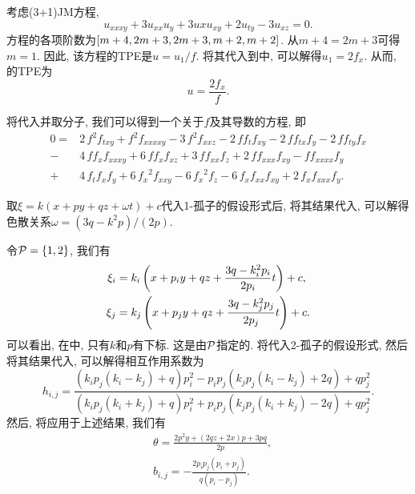 考虑(3+1)JM方程\CITEcaJM,
\begin{equation}
    u_{xxxy}+3u_{xx}u_y+3u{x}u_{xy}+2u_{ty}-3u_{xz}=0. \label{JMEQ3}
\end{equation}
方程的各项阶数为$\left[m+4,2m+3,2m+3,m+2,m+2\right]$. 从$m+4=2m+3$可得$m=1$. 因此, 该方程的TPE是$u=u_1/f$. 将其代入到中, 可以解得$u_1=2f_x$. 从而, 的TPE为 
\begin{equation}
u=\frac{2f_x}{f}. \label{JMEQ-tr}    
\end{equation}

将代入并取分子, 我们可以得到一个关于$f$及其导数的方程, 即 
\begin{equation}
\begin{split}
0=&2\,{f}^{2}f_{{{ txy}}}+{f}^{2}f_{{{ xxxxy}}}-3\,{f}^{2}f_{{{ xxz}}}-2\,ff_{{t}}f_{{{ xy}}}-2\,ff_{{{ tx}}}f_{{y}}-2\,ff_{{{ ty}}}f_{{x}}\\
-&4\,ff_{{x}}f_{{{ xxxy}}}+6\,ff_{{x}}f_{{{ xz}}}+3\,ff_{{{ xx}}}f_{{z}}+2\,ff_{{{ xxx}}}f_{{{xy}}}-ff_{{{ xxxx}}}f_{{y}}\\
+&4\,f_{{t}}f_{{x}}f_{{y}}+6\,{f_{{x}}}^{2}f_{{{ xxy}}}-6\,{f_{{x}}}^{2}f_{{z}}-6\,f_{{x}}f_{{{ xx}}}f_{{{ xy}}}+2\,f_{{x}}f_{{{ xxx}}}f_{{y}}. \label{JMEQ-feq}
\end{split}
\end{equation}

取$\xi=k(x+py+qz+\omega t)+c$代入1-孤子的假设形式后, 将其结果代入, 可以解得色散关系$\omega=(3q-k^2p)/(2p)$.

令$\mathcal{P}=\left\{1,2\right\}$, 我们有
\begin{equation}
\begin{split}
\xi_i&=k_i\left(x+p_iy+qz+\frac{3q-k_i^2p_i}{2p_i}t\right)+c, \\ 
\xi_j&=k_j\left(x+p_jy+qz+\frac{3q-k_j^2p_j}{2p_j}t\right)+c.
\end{split} \label{JMEQ-xij}
\end{equation}
可以看出, 在中, 只有$k$和$p$有下标. 这是由$\mathcal{P}$指定的. 将代入2-孤子的假设形式, 然后将其结果代入, 可以解得相互作用系数为
\begin{equation}
    h_{i,j}=\frac{(k_ip_j(k_i-k_j)+q)p_i^2-p_ip_j(k_jp_j(k_i-k_j)+2q)+qp_j^2}{(k_ip_j(k_i+k_j)+q)p_i^2+p_ip_j(k_jp_j(k_i+k_j)-2q)+qp_j^2}.
\end{equation}
然后, 将应用于上述结果, 我们有
\begin{equation}
\begin{split}
&\theta=\frac{2p^2y+(2qz+2x)p+3pq}{2p}, \\ 
&b_{i,j}=-\frac{2p_ip_j(p_i+p_j)}{q(p_i-p_j)}.
\end{split}
\end{equation}


